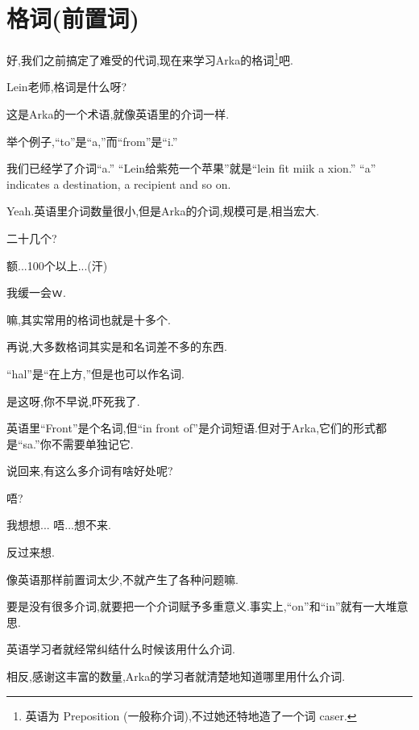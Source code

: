\chapter[格词]{格词(前置词)}

好,我们之前搞定了难受的代词,现在来学习Arka的格词\footnote{英语为 Preposition (一般称介词),不过她还特地造了一个词 caser.}吧.


Lein老师,格词是什么呀?


这是Arka的一个术语,就像英语里的介词一样.

举个例子,``to''是``a,''而``from''是``i.''


我们已经学了介词``a.''
``Lein给紫苑一个苹果''就是``lein fit miik a xion.''
``a'' indicates a destination, a recipient and so on.


Yeah.英语里介词数量很小,但是Arka的介词,规模可是,相当宏大.


二十几个?


额...100个以上...(汗)


我缓一会\quad ｗ.


嘛,其实常用的格词也就是十多个.

再说,大多数格词其实是和名词差不多的东西.

``hal''是``在上方,''但是也可以作名词.


是这呀,你不早说,吓死我了.

英语里``Front''是个名词,但``in front of''是介词短语.但对于Arka,它们的形式都是``sa.''你不需要单独记它.


说回来,有这么多介词有啥好处呢?


唔?

我想想... 唔...想不来.


反过来想.

像英语那样前置词太少,不就产生了各种问题嘛.


要是没有很多介词,就要把一个介词赋予多重意义.事实上,``on''和``in''就有一大堆意思.

英语学习者就经常纠结什么时候该用什么介词.


相反,感谢这丰富的数量,Arka的学习者就清楚地知道哪里用什么介词.


